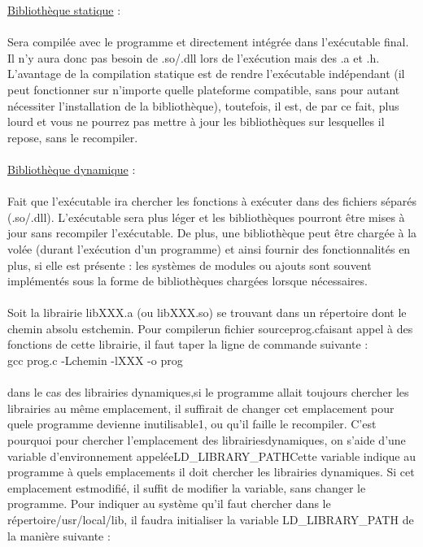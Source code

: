 \documentclass[a4paper,12pt,openany]{book}
\begin{document}
\underline{Bibliothèque statique} :\\
\\
Sera compilée avec le programme et directement intégrée dans l'exécutable final. Il n'y aura donc pas besoin de .so/.dll lors de l'exécution mais des .a et .h. L'avantage de la compilation statique est de rendre l'exécutable indépendant (il peut fonctionner sur n'importe quelle plateforme compatible, sans pour autant nécessiter l'installation de la bibliothèque), toutefois, il est, de par ce fait, plus lourd et vous ne pourrez pas mettre à jour les bibliothèques sur lesquelles il repose, sans le recompiler.\\
\\
\underline{Bibliothèque dynamique} : \\
\\
Fait que l'exécutable ira chercher les fonctions à exécuter dans des fichiers séparés (.so/.dll). L'exécutable sera plus léger et les bibliothèques pourront être mises à jour sans recompiler l'exécutable. De plus, une bibliothèque peut être chargée à la volée (durant l'exécution d'un programme) et ainsi fournir des fonctionnalités en plus, si elle est présente : les systèmes de modules ou ajouts sont souvent implémentés sous la forme de bibliothèques chargées lorsque nécessaires.\\
\\
Soit la librairie libXXX.a (ou libXXX.so) se trouvant dans un répertoire dont le chemin absolu estchemin. Pour compilerun fichier sourceprog.cfaisant appel à des fonctions de cette librairie, il faut taper la ligne de commande suivante :\\
gcc prog.c -Lchemin -lXXX -o prog\\
\\
dans le cas des librairies dynamiques,si le programme allait toujours chercher les librairies au même emplacement, il suffirait de changer cet emplacement pour quele  programme  devienne  inutilisable1,  ou  qu’il  faille  le  recompiler.  C’est  pourquoi  pour  chercher  l’emplacement  des  librairiesdynamiques, on s’aide d’une variable d’environnement appeléeLD_LIBRARY_PATHCette variable indique au programme à quels emplacements il doit chercher les librairies dynamiques. Si cet emplacement estmodifié, il suffit de modifier la variable, sans changer le programme. Pour indiquer au système qu’il faut chercher dans le répertoire/usr/local/lib, il faudra initialiser la variable LD_LIBRARY_PATH de la manière suivante :\\
\\
\end{document}
